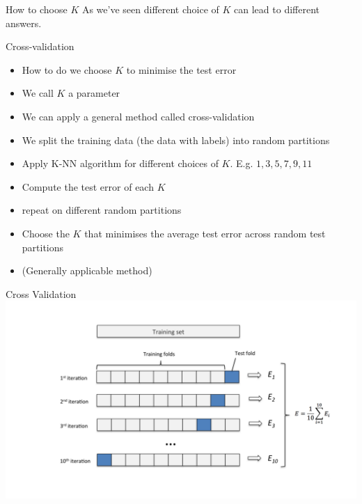 \documentclass{bredelebeamer}
\begin{document}
\begin{frame}{How to choose $K$}
As we've seen different choice of $K$ can lead to different answers.
\begin{exampleblock}{Cross-validation}
	
	\begin{itemize}
		\item How to do we choose $K$ to minimise the test error
		\item We call $K$ a parameter
		\item We can apply a general method called cross-validation
		\item We split the training data (the data with labels) into random partitions
		\item Apply K-NN algorithm for different choices of $K$. E.g. $1,3,5,7,9,11$
		\item Compute the test error of each $K$
		\item repeat on different random partitions
		\item Choose the $K$ that minimises the average test error across random test partitions
		\item (Generally applicable method)
	\end{itemize}
 
\end{exampleblock}

\end{frame}

\begin{frame}{Cross Validation}
\includegraphics[width = 1\textwidth]{cv}
\end{frame}
\end{document}
